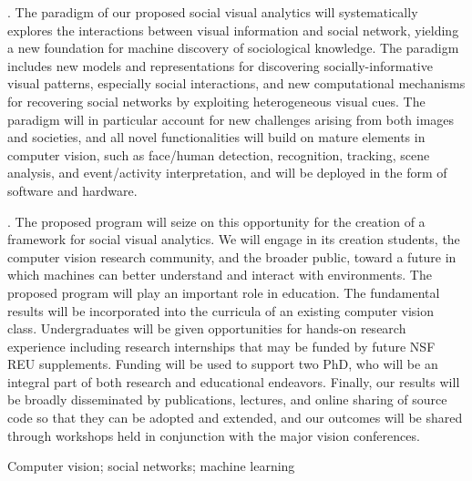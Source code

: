 . The paradigm of our proposed social visual analytics will systematically explores the interactions between visual information and social network, yielding a new foundation for machine discovery of sociological knowledge. The paradigm includes new models and representations for discovering socially-informative visual patterns, especially social interactions, and new computational mechanisms for recovering social networks by exploiting heterogeneous visual cues. The paradigm will in particular account for new challenges arising from both images and societies, and all novel functionalities will build on mature elements in computer vision, such as face/human detection, recognition, tracking, scene analysis, and event/activity interpretation, and will be deployed in the form of software and hardware.

. The proposed program will seize on this opportunity for the creation of a framework for social visual analytics. We will engage in its creation students, the computer vision research community, and the broader public, toward a future in which machines can better understand and interact with environments. The proposed program will play an important role in education. The fundamental results will be incorporated into the curricula of an existing computer vision class. Undergraduates will be given opportunities for hands-on research experience including research internships that may be funded by future NSF REU supplements. Funding will be used to support two PhD, who will be an integral part of both research and educational endeavors. Finally, our results will be broadly disseminated by publications, lectures, and online sharing of source code so that they can be adopted and extended, and our outcomes will be shared through workshops held in conjunction with the major vision conferences. 

 Computer vision; social networks; machine learning


